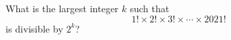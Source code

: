 What is the largest integer $k$ such that
\[1!\times2!\times3!\times\cdots\times2021!\]
is divisible by $2^k$?
